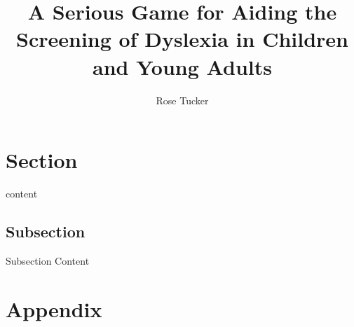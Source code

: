 \documentclass[journal]{IEEEtran}
\begin{document}
\title{\textbf{A Serious Game for Aiding the Screening of Dyslexia in Children and Young Adults}}
\author{Rose Tucker}

\maketitle


\begin{abstract}
\end{abstract}

\section{ Section}
 content

\subsection{Subsection}
Subsection Content


\section{Appendix}
\end{document}

